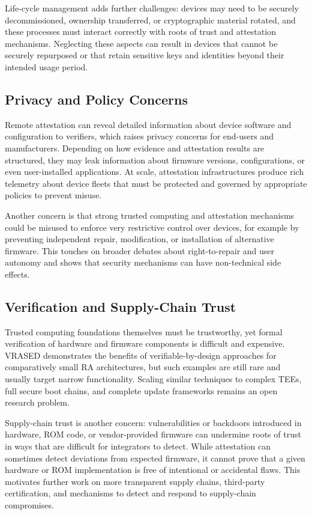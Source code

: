 \documentclass[conference,11pt,a4paper]{IEEEtran}
\begin{document}
Life-cycle management adds further challenges: devices may need to be securely decommissioned, ownership transferred, or cryptographic material rotated, and these processes must interact correctly with roots of trust and attestation mechanisms.\cite{suit_arch,tcg_tpm_iot} Neglecting these aspects can result in devices that cannot be securely repurposed or that retain sensitive keys and identities beyond their intended usage period.\cite{tcg_iot}

\subsection{Privacy and Policy Concerns}
Remote attestation can reveal detailed information about device software and configuration to verifiers, which raises privacy concerns for end-users and manufacturers. Depending on how evidence and attestation results are structured, they may leak information about firmware versions, configurations, or even user-installed applications.\cite{rats_arch,charra_pm} At scale, attestation infrastructures produce rich telemetry about device fleets that must be protected and governed by appropriate policies to prevent misuse.

Another concern is that strong trusted computing and attestation mechanisms could be misused to enforce very restrictive control over devices, for example by preventing independent repair, modification, or installation of alternative firmware. This touches on broader debates about right-to-repair and user autonomy and shows that security mechanisms can have non-technical side effects.\cite{tcg_iot}

\subsection{Verification and Supply-Chain Trust}
Trusted computing foundations themselves must be trustworthy, yet formal verification of hardware and firmware components is difficult and expensive. VRASED demonstrates the benefits of verifiable-by-design approaches for comparatively small RA architectures, but such examples are still rare and usually target narrow functionality.\cite{vRased_usenix,root_of_trust_lowend} Scaling similar techniques to complex TEEs, full secure boot chains, and complete update frameworks remains an open research problem.\cite{ra_survey,resource_constrained}

Supply-chain trust is another concern: vulnerabilities or backdoors introduced in hardware, ROM code, or vendor-provided firmware can undermine roots of trust in ways that are difficult for integrators to detect. While attestation can sometimes detect deviations from expected firmware, it cannot prove that a given hardware or ROM implementation is free of intentional or accidental flaws.\cite{root_of_trust_lowend} This motivates further work on more transparent supply chains, third-party certification, and mechanisms to detect and respond to supply-chain compromises.\cite{tcg_iot}
\end{document}
